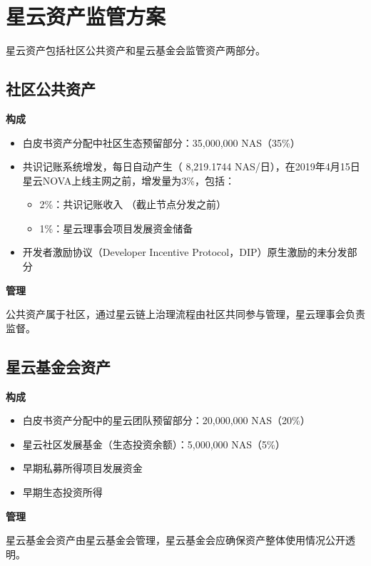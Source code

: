 \section{星云资产监管方案}

星云资产包括社区公共资产和星云基金会监管资产两部分。

\subsection{社区公共资产}

\textbf{构成}

\begin{itemize}
	\item 白皮书资产分配中社区生态预留部分：35,000,000 NAS（35\%）
    \item 共识记账系统增发，每日自动产生（ 8,219.1744 NAS/日），在2019年4月15日星云NOVA上线主网之前，增发量为3\%，包括：
	    \begin{itemize}
			\item 2\%：共识记账收入 （截止节点分发之前）
			\item 1\%：星云理事会项目发展资金储备
		\end{itemize}
	\item 开发者激励协议（Developer Incentive Protocol，DIP）原生激励的未分发部分
\end{itemize}

\textbf{管理}

公共资产属于社区，通过星云链上治理流程由社区共同参与管理，星云理事会负责监督。

\subsection{星云基金会资产}

\textbf{构成}

\begin{itemize}
	\item 白皮书资产分配中的星云团队预留部分：20,000,000 NAS（20\%）
    \item 星云社区发展基金（生态投资余额）：5,000,000 NAS（5\%）
	\item 早期私募所得项目发展资金
	\item 早期生态投资所得
\end{itemize}

\textbf{管理}

星云基金会资产由星云基金会管理，星云基金会应确保资产整体使用情况公开透明。


